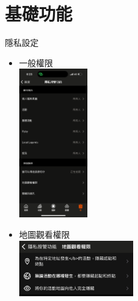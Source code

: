 \section{基礎功能}

\begin{frame}{隱私設定}
\begin{multicols}{2}
\begin{itemize}
\item 一般權限\\
\includegraphics[width=3cm]{privacy.png}\pause
\item 地圖觀看權限\\
\includegraphics[width=5cm]{hideMap.png}
\end{itemize}
\end{multicols}
\end{frame}

